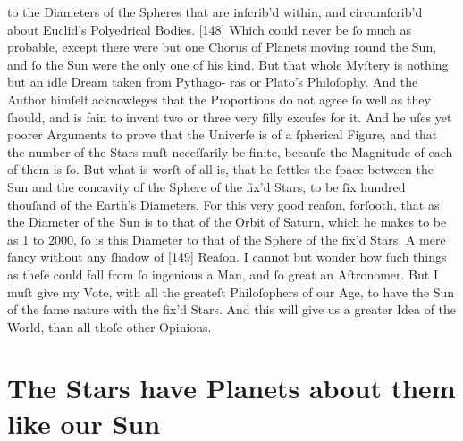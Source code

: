 \documentclass[letterpaper]{book}
\begin{document}
to the Diameters of the Spheres that are inſcrib'd within, and circumſcrib'd
about Euclid's Polyedrical Bodies. [148] Which could never be ſo much as
probable, except there were but one Chorus of Planets moving round the
Sun, and ſo the Sun were the only one of his kind.
But that whole Myſtery is nothing but an idle Dream taken from Pythago-
ras or Plato's Philoſophy. And the Author himſelf acknowleges that the
Proportions do not agree ſo well as they ſhould, and is fain to invent two or
three very ſilly excuſes for it. And he uſes yet poorer Arguments to prove
that the Univerſe is of a ſpherical Figure, and that the number of the Stars
muſt neceſſarily be finite, becauſe the Magnitude of each of them is ſo.
But what is worſt of all is, that he ſettles the ſpace between the Sun and
the concavity of the Sphere of the fix'd Stars, to be ſix hundred thouſand
of the Earth's Diameters. For this very good reaſon, forſooth, that as the
Diameter of the Sun is to that of the Orbit of Saturn, which he makes to be
as 1 to 2000, ſo is this Diameter to that of the Sphere of the fix'd Stars. A
mere fancy without any ſhadow of [149] Reaſon. I cannot but wonder how
ſuch things as theſe could fall from ſo ingenious a Man, and ſo great an
Aſtronomer. But I muſt give my Vote, with all the greateſt Philoſophers of
our Age, to have the Sun of the ſame nature with the fix'd Stars. And this
will give us a greater Idea of the World, than all thoſe other Opinions.


\section{The Stars have Planets about them like our Sun}
\end{document}
